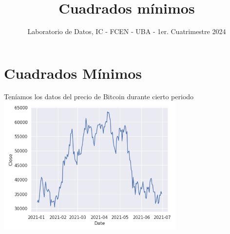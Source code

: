 \documentclass[aspectratio=169, usenames,dvipsnames]{beamer}
\title{Cuadrados mínimos}
\subtitle{Laboratorio de Datos, IC - FCEN - UBA - 1er. Cuatrimestre 2024}
\author{}
\begin{document}
  \frame[c]{\maketitle}




\section{Cuadrados Mínimos}

\begin{frame}
    \centering
    Teníamos los datos del precio de Bitcoin durante cierto periodo
    \includegraphics[width=0.7\textwidth]{img/bitcoin.png}
\end{frame}
\end{document}
